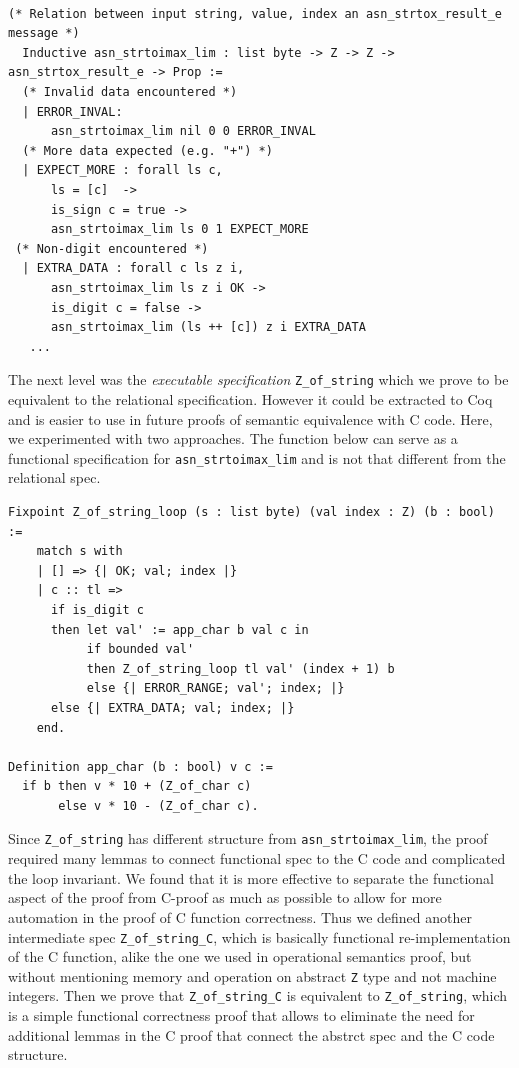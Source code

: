 \documentclass[acmsmall,nonacm]{acmart}
\begin{document}
 \begin{lstlisting}[language=Coq]

(* Relation between input string, value, index an asn_strtox_result_e message *)
  Inductive asn_strtoimax_lim : list byte -> Z -> Z -> asn_strtox_result_e -> Prop :=
  (* Invalid data encountered *)
  | ERROR_INVAL:
      asn_strtoimax_lim nil 0 0 ERROR_INVAL
  (* More data expected (e.g. "+") *)
  | EXPECT_MORE : forall ls c,
      ls = [c]  ->
      is_sign c = true ->
      asn_strtoimax_lim ls 0 1 EXPECT_MORE
 (* Non-digit encountered *)
  | EXTRA_DATA : forall c ls z i,
      asn_strtoimax_lim ls z i OK ->
      is_digit c = false -> 
      asn_strtoimax_lim (ls ++ [c]) z i EXTRA_DATA
   ...    
  \end{lstlisting}

  The next level was the \textit{executable specification}
  \texttt{Z\_of\_string} which we prove to be equivalent to the
  relational specification. However it could be extracted to Coq and
  is easier to use in future proofs of semantic equivalence with C
  code. Here, we experimented with two approaches. The function below
  can serve as a functional specification for
  \texttt{asn\_strtoimax\_lim} and is not that different from the
  relational spec.

 \begin{lstlisting}[language=Coq]
Fixpoint Z_of_string_loop (s : list byte) (val index : Z) (b : bool) := 
    match s with 
    | [] => {| OK; val; index |}
    | c :: tl => 
      if is_digit c
      then let val' := app_char b val c in 
           if bounded val'
           then Z_of_string_loop tl val' (index + 1) b
           else {| ERROR_RANGE; val'; index; |}      
      else {| EXTRA_DATA; val; index; |}              
    end.

Definition app_char (b : bool) v c := 
  if b then v * 10 + (Z_of_char c) 
       else v * 10 - (Z_of_char c).
 \end{lstlisting}

 Since \texttt{Z\_of\_string} has different structure from
 \texttt{asn\_strtoimax\_lim}, the proof required many lemmas to
 connect functional spec to the C code and complicated the loop
 invariant. We found that it is more effective to separate the
 functional aspect of the proof from C-proof as much as possible to
 allow for more automation in the proof of C function
 correctness. Thus we defined another intermediate spec
 \texttt{Z\_of\_string\_C}, which is basically functional
 re-implementation of the C function, alike the one we used in
 operational semantics proof, but without mentioning memory and
 operation on abstract \texttt{Z} type and not machine integers. Then
 we prove that \texttt{Z\_of\_string\_C} is equivalent to
 \texttt{Z\_of\_string}, which is a simple functional correctness
 proof that allows to eliminate the need for additional lemmas in the
 C proof that connect the abstrct spec and the C code structure.
\end{document}
